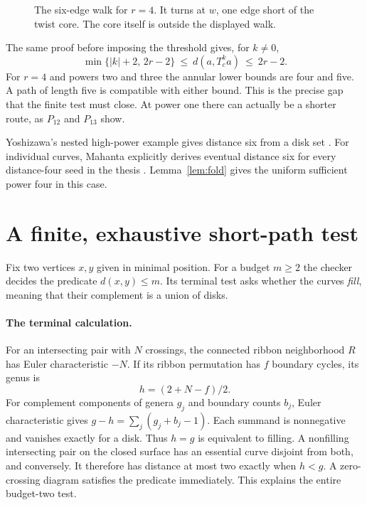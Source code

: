 \documentclass[11pt,a4paper]{article}
\begin{document}
\begin{figure}[h]
\centering
{}
\caption{The six-edge walk for \(r=4\). It turns at \(w\), one edge
short of the twist core. The core itself is outside the displayed walk.}
\end{figure}

The same proof before imposing the threshold gives, for \(k\ne0\),
\[
 \min\{|k|+2,\,2r-2\}\ \le\ d(a,T_c^k a)\ \le\ 2r-2 .
\]
For \(r=4\) and powers two and three the annular lower bounds are four
and five. A path of length five is compatible with either bound. This
is the precise gap that the finite test must close. At power one there
can actually be a shorter route, as \(P_{12}\) and \(P_{13}\) show.

Yoshizawa's nested high-power example gives distance six from a disk
set \cite[p.~1000]{Y}. For individual curves, Mahanta explicitly derives
eventual distance six for every distance-four seed in the thesis
\cite[pp.~47--48]{MT}. Lemma~\ref{lem:fold} gives the uniform sufficient
power four in this case.

\clearpage
\section{A finite, exhaustive short-path test}\label{sec:finite}
Fix two vertices \(x,y\) given in minimal position. For a budget \(m\ge2\)
the checker decides the predicate \(d(x,y)\le m\). Its terminal test asks
whether the curves \emph{fill}, meaning that their complement is a union
of disks.

\paragraph{The terminal calculation.}
For an intersecting pair with \(N\) crossings, the connected ribbon
neighborhood \(R\) has Euler characteristic \(-N\). If its ribbon
permutation has \(f\) boundary cycles, its genus is
\[
                         h=(2+N-f)/2.
\]
For complement components of genera \(g_j\) and boundary counts \(b_j\),
Euler characteristic gives
\(g-h=\sum_j(g_j+b_j-1)\). Each summand is nonnegative and vanishes
exactly for a disk. Thus \(h=g\) is equivalent to filling. A
nonfilling intersecting pair on the closed surface has an essential
curve disjoint from both, and conversely. It therefore has distance at
most two exactly when \(h<g\). A zero-crossing diagram satisfies the
predicate immediately. This explains the entire budget-two test.
\end{document}
